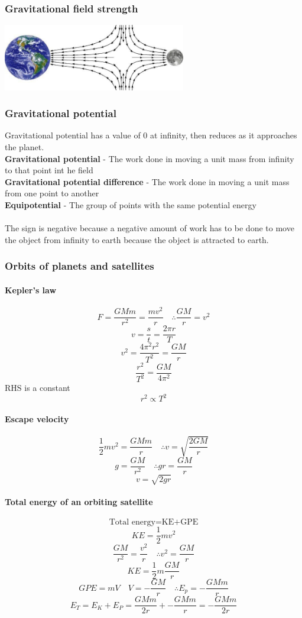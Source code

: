 \documentclass[12pt]{article}
\begin{document}
\subsubsection{Gravitational field strength}
\includegraphics[width=8cm]{gravity.jpg}
\subsubsection{Gravitational potential}
Gravitational potential has a value of 0 at infinity, then reduces as it approaches the planet.\\
\textbf{Gravitational potential} - The work done in moving a unit mass from infinity to that point int he field\\
\textbf{Gravitational potential difference} - The work done in moving a unit mass from one point to another \\
\textbf{Equipotential} - The group of points with the same potential energy\\
\\
The sign is negative because a negative amount of work has to be done to move the object from infinity to earth because the object is attracted to earth.
\subsubsection{Orbits of planets and satellites}
\paragraph{Kepler's law}
$$F=\frac{GMm}{r^2}=\frac{mv^2}{r}\quad \therefore \frac{GM}{r}=v^2$$
$$v=\frac{s}{t}=\frac{2\pi r}{T}$$
$$v^2=\frac{4\pi^2r^2}{T^2}=\frac{GM}{r}$$
$$\frac{r^2}{T^2}=\frac{GM}{4\pi^2}$$
RHS is a constant
$$r^2\propto T^2$$
\paragraph{Escape velocity}
$$\frac{1}{2}mv^2=\frac{GMm}{r}\quad \therefore v=\sqrt{\frac{2GM}{r}}$$
$$g=\frac{GM}{r^2}\quad \therefore gr=\frac{GM}{r}$$
$$v=\sqrt{2gr}$$
\paragraph{Total energy of an orbiting satellite}
$$\textrm{Total energy=KE+GPE}$$
$$KE=\frac{1}{2}mv^2$$
$$\frac{GM}{r^2}=\frac{v^2}{r}\quad \therefore v^2=\frac{GM}{r}$$
$$KE=\frac{1}{2}m\frac{GM}{r}$$
$$GPE=mV \quad	V=-\frac{GM}{r} \quad \therefore E_p=-\frac{GMm}{r}$$
$$E_T=E_K+E_P=\frac{GMm}{2r}+-\frac{GMm}{r}=-\frac{GMm}{2r}$$
\end{document}
